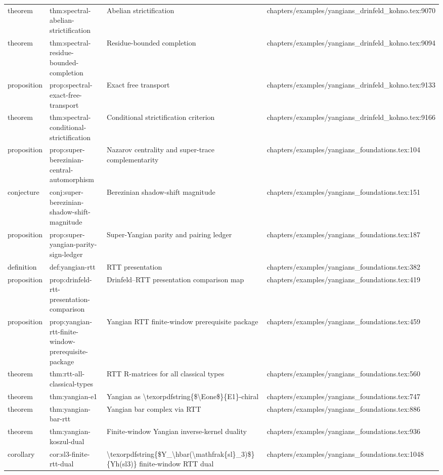 \documentclass[11pt]{article}
\begin{document}
\begin{longtable}{L{0.10\textwidth}L{0.26\textwidth}L{0.42\textwidth}L{0.22\textwidth}}
theorem & thm:spectral-abelian-strictification & Abelian strictification & chapters/examples/yangians\_drinfeld\_kohno.tex:9070\\
theorem & thm:spectral-residue-bounded-completion & Residue-bounded completion & chapters/examples/yangians\_drinfeld\_kohno.tex:9094\\
proposition & prop:spectral-exact-free-transport & Exact free transport & chapters/examples/yangians\_drinfeld\_kohno.tex:9133\\
theorem & thm:spectral-cond{}itional-strictification & Cond{}itional strictification criterion & chapters/examples/yangians\_drinfeld\_kohno.tex:9166\\
proposition & prop:super-berezinian-central-automorphism & Nazarov centrality and super-trace complementarity & chapters/examples/yangians\_foundations.tex:104\\
conjecture & conj:super-berezinian-shadow-shift-magnitude & Berezinian shadow-shift magnitude & chapters/examples/yangians\_foundations.tex:151\\
proposition & prop:super-yangian-parity-sign-led{}ger & Super-Yangian parity and pairing led{}ger & chapters/examples/yangians\_foundations.tex:187\\
definition & def:yangian-rtt & RTT presentation & chapters/examples/yangians\_foundations.tex:382\\
proposition & prop:drinfeld-rtt-presentation-comparison & Drinfeld--RTT presentation comparison map & chapters/examples/yangians\_foundations.tex:419\\
proposition & prop:yangian-rtt-finite-window-prerequisite-package & Yangian RTT finite-window prerequisite package & chapters/examples/yangians\_foundations.tex:459\\
theorem & thm:rtt-all-classical-types & RTT R-matrices for all classical types & chapters/examples/yangians\_foundations.tex:560\\
theorem & thm:yangian-e1 & Yangian as \textbackslash{}texorpdfstring\{\$\textbackslash{}Eone\$\}\{E1\}-chiral & chapters/examples/yangians\_foundations.tex:747\\
theorem & thm:yangian-bar-rtt & Yangian bar complex via RTT & chapters/examples/yangians\_foundations.tex:886\\
theorem & thm:yangian-koszul-dual & Finite-window Yangian inverse-kernel duality & chapters/examples/yangians\_foundations.tex:936\\
corollary & cor:sl3-finite-rtt-dual & \textbackslash{}texorpdfstring\{\$Y\_\textbackslash{}hbar(\textbackslash{}mathfrak\{sl\}\_3)\$\}\{Yh(sl3)\} finite-window RTT dual & chapters/examples/yangians\_foundations.tex:1048\\

\end{longtable}
\end{document}
